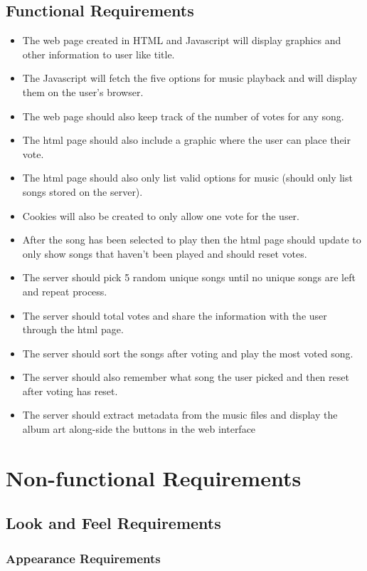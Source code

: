 \documentclass[12pt, titlepage]{article}
\begin{document}
\subsection{Functional Requirements}
\begin{itemize}
\item The web page created in HTML and Javascript will display graphics and other information to user like title.
\item The Javascript will fetch the five options for music playback and will display them on the user's browser.
\item The web page should also keep track of the number of votes for any song.
\item The html page should also include a graphic where the user can place their vote.
\item The html page should also only list valid options for music (should only list songs stored on the server).
\item Cookies will also be created to only allow one vote for the user.
\item After the song has been selected to play then the html page should update to only show songs that haven't been played and should reset votes.
\item The server should pick 5 random unique songs until no unique songs are left and repeat process.
\item The server should total votes and share the information with the user through the html page.
\item The server should sort the songs after voting and play the most voted song.
\item The server should also remember what song the user picked and then reset after voting has reset.
\item The server should extract metadata from the music files and display the album art along-side the buttons in the web interface
\end{itemize}

\section{Non-functional Requirements}

\subsection{Look and Feel Requirements}

\subsubsection{Appearance Requirements}
\end{document}

